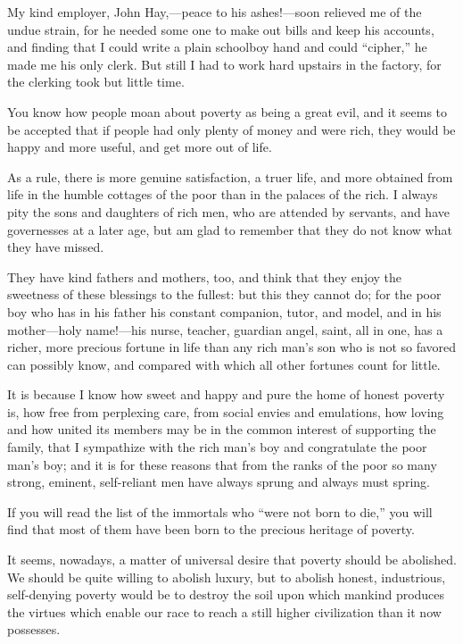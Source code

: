 \documentclass[11pt,openany]{book}
\begin{document}
My kind employer, John Hay,---peace to his ashes!---soon relieved me of the undue strain, for he needed some one to make out bills and keep his accounts, and finding that I could write a plain schoolboy hand and could ``cipher,'' he made me his only clerk. But still I had to work hard upstairs in the factory, for the clerking took but little time.

You know how people moan about poverty as being a great evil, and it seems to be accepted that if people had only plenty of money and were rich, they would be happy and more useful, and get more out of life.

As a rule, there is more genuine satisfaction, a truer life, and more obtained from life in the humble cottages of the poor than in the palaces of the rich. I always pity the sons and daughters of rich men, who are attended by servants, and have governesses at a later age, but am glad to remember that they do not know what they have missed.

They have kind fathers and mothers, too, and think that they enjoy the sweetness of these blessings to the fullest: but this they cannot do; for the poor boy who has in his father his constant companion, tutor, and model, and in his mother---holy name!---his nurse, teacher, guardian angel, saint, all in one, has a richer, more precious fortune in life than any rich man's son who is not so favored can possibly know, and compared with which all other fortunes count for little.

It is because I know how sweet and happy and pure the home of honest poverty is, how free from perplexing care, from social envies and emulations, how loving and how united its members may be in the common interest of supporting the family, that I sympathize with the rich man's boy and congratulate the poor man's boy; and it is for these reasons that from the ranks of the poor so many strong, eminent, self-reliant men have always sprung and always must spring.

If you will read the list of the immortals who ``were not born to die,'' you will find that most of them have been born to the precious heritage of poverty.

It seems, nowadays, a matter of universal desire that poverty should be abolished. We should be quite willing to abolish luxury, but to abolish honest, industrious, self-denying poverty would be to destroy the soil upon which mankind produces the virtues which enable our race to reach a still higher civilization than it now possesses.
\end{document}
